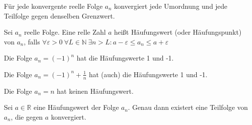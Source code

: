 \begin{theorem}
  Für jede konvergente reelle Folge $a_n$ konvergiert jede Umordnung und jede Teilfolge gegen denselben Grenzwert.
\end{theorem}

\begin{definition}
  Sei $a_n$ reelle Folge. Eine relle Zahl $a$ heißt Häufungswert (oder Häufungspunkt) von $a_n$, falls $\forall \varepsilon > 0\: \forall L \in \mathbb{N}\: \exists n > L: a-\varepsilon \le a_n \le a+\varepsilon$
\end{definition}

\begin{example}
  Die Folge $a_n = (-1)^n$ hat die Häufungswerte 1 und -1.

  Die Folge $a_n = (-1)^n + \frac{1}{n}$ hat (auch) die Häufungswerte 1 und -1.

  Die Folge $a_n = n$ hat keinen Häufungswert.
\end{example}

\begin{theorem}
  Sei $a \in \mathbb{R}$ eine Häufungswert der Folge $a_n$. Genau dann existert eine Teilfolge von $a_n$, die gegen $a$ konvergiert.
\end{theorem}